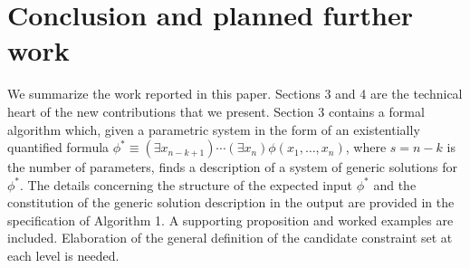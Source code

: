 \documentclass{article}
\def\lexl{lex-least\xspace}
\begin{document}





\section{Conclusion and planned further work}
We summarize the work reported in this paper. Sections 3 and 4 are 
the technical heart of the new contributions that we present.
Section 3 contains a formal algorithm which, given a parametric
system in the form of an existentially quantified formula
$\phi^* \equiv (\exists x_{n-k+1}) \cdots (\exists x_n) 
               \phi(x_1, \ldots, x_n)$, where $s = n-k$
is the number of parameters, finds a description of
a system of generic solutions for $\phi^*$.
The details concerning the structure of the expected input $\phi^*$
and the constitution of the generic solution description in the output
are provided in the specification of Algorithm 1.
A supporting proposition and worked examples are included.
Elaboration of the general definition of the candidate constraint set
at each level is needed.
\end{document}
